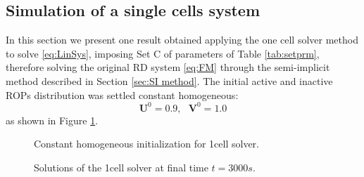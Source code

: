 \subsection{Simulation of a single cells system}
In this section we present one result obtained applying the one cell solver method to solve \eqref{eq:LinSys}, imposing Set C of parameters of Table \ref{tab:setprm}, therefore solving the original RD system \eqref{eq:FM} through the semi-implicit method described in Section \ref{sec:SI method}. The initial active and inactive ROPs distribution was settled constant homogeneous:
\begin{equation*}
    \mathbf{U}^0 = 0.9, \ \ \ \mathbf{V}^0 = 1.0
\end{equation*}
as shown in Figure \ref{fig:1cellSolI}.

\begin{figure}[H]
    \centering
    \quad
    \caption[Single cell at $t = 0s$]{Constant homogeneous initialization for 1cell solver.}
    \label{fig:1cellSolI}
\end{figure}

\begin{figure}[H]
    \centering
    \quad
    \caption[Single cell at $t = 3000s$]{Solutions of the 1cell solver at final time $t = 3000s$.}
    \label{fig:1cellSolF}
\end{figure}


